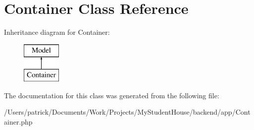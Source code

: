 \hypertarget{class_app_1_1_container}{}\section{Container Class Reference}
\label{class_app_1_1_container}
Inheritance diagram for Container\+:\begin{figure}[H]
\begin{center}
\leavevmode
\includegraphics[height=2.000000cm]{class_app_1_1_container}
\end{center}
\end{figure}


The documentation for this class was generated from the following file\+:\begin{DoxyCompactItemize}
\item 
/\+Users/patrick/\+Documents/\+Work/\+Projects/\+My\+Student\+House/backend/app/Container.\+php\end{DoxyCompactItemize}
